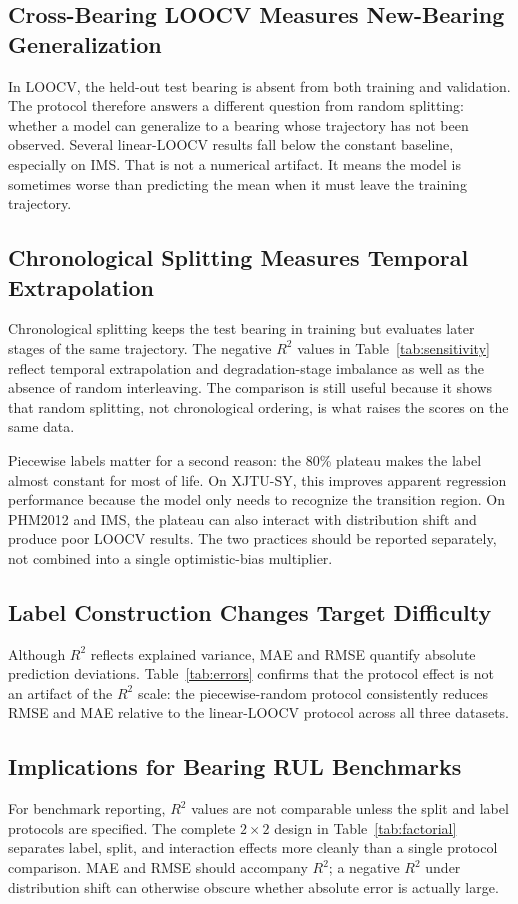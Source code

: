 \documentclass[pdflatex,sn-mathphys-num]{sn-jnl}
\begin{document}
\subsection{Cross-Bearing LOOCV Measures New-Bearing Generalization}
In LOOCV, the held-out test bearing is absent from both training and validation. The protocol therefore answers a different question from random splitting: whether a model can generalize to a bearing whose trajectory has not been observed. Several linear-LOOCV results fall below the constant baseline, especially on IMS. That is not a numerical artifact. It means the model is sometimes worse than predicting the mean when it must leave the training trajectory.

\subsection{Chronological Splitting Measures Temporal Extrapolation}
Chronological splitting keeps the test bearing in training but evaluates later stages of the same trajectory. The negative $R^2$ values in Table~\ref{tab:sensitivity} reflect temporal extrapolation and degradation-stage imbalance as well as the absence of random interleaving. The comparison is still useful because it shows that random splitting, not chronological ordering, is what raises the scores on the same data.

Piecewise labels matter for a second reason: the 80\% plateau makes the label almost constant for most of life. On XJTU-SY, this improves apparent regression performance because the model only needs to recognize the transition region. On PHM2012 and IMS, the plateau can also interact with distribution shift and produce poor LOOCV results. The two practices should be reported separately, not combined into a single optimistic-bias multiplier.
\subsection{Label Construction Changes Target Difficulty}

Although $R^2$ reflects explained variance, MAE and RMSE quantify absolute prediction deviations. Table~\ref{tab:errors} confirms that the protocol effect is not an artifact of the $R^2$ scale: the piecewise-random protocol consistently reduces RMSE and MAE relative to the linear-LOOCV protocol across all three datasets.

\subsection{Implications for Bearing RUL Benchmarks}
For benchmark reporting, $R^2$ values are not comparable unless the split and label protocols are specified. The complete $2 \times 2$ design in Table~\ref{tab:factorial} separates label, split, and interaction effects more cleanly than a single protocol comparison. MAE and RMSE should accompany $R^2$; a negative $R^2$ under distribution shift can otherwise obscure whether absolute error is actually large.
\end{document}
